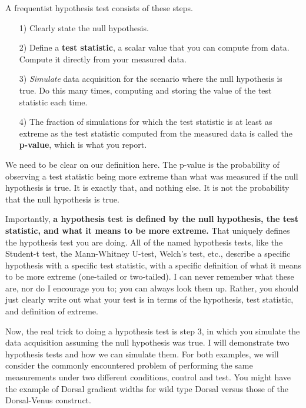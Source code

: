 A frequentist hypothesis test consists of these steps.
\begin{enumerate}
    \item[1)] Clearly state the null hypothesis.
    \item[2)] Define a \textbf{test statistic}, a scalar value that you can compute from data. Compute it directly from your measured data.
    \item[3)] \textit{Simulate} data acquisition for the scenario where the null hypothesis is true. Do this many times, computing and storing the value of the test statistic each time.
    \item[4)] The fraction of simulations for which the test statistic is at least as extreme as the test statistic computed from the measured data is called the \textbf{p-value}, which is what you report.
\end{enumerate}
We need to be clear on our definition here. The p-value is the probability of observing a test statistic being more extreme than what was measured if the null hypothesis is true. It is exactly that, and nothing else. It is not the probability that the null hypothesis is true.

Importantly, \textbf{a hypothesis test is defined by the null hypothesis, the test statistic, and what it means to be more extreme.} That uniquely defines the hypothesis test you are doing. All of the named hypothesis tests, like the Student-t test, the Mann-Whitney U-test, Welch's test, etc., describe a specific hypothesis with a specific test statistic, with a specific definition of what it means to be more extreme (one-tailed or two-tailed). I can never remember what these are, nor do I encourage you to; you can always look them up. Rather, you should just clearly write out what your test is in terms of the hypothesis, test statistic, and definition of extreme.

Now, the real trick to doing a hypothesis test is step 3, in which you simulate the data acquisition assuming the null hypothesis was true. I will demonstrate two hypothesis tests and how we can simulate them. For both examples, we will consider the commonly encountered problem of performing the same measurements under two different conditions, control and test. You might have the example of Dorsal gradient widths for wild type Dorsal versus those of the Dorsal-Venus construct.

